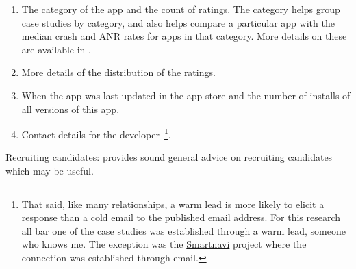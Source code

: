 \begin{enumerate}[label=(\alph*)]
    \itemsep0em
    \item The category of the app and the count of ratings. The category helps group case studies by category, and also helps compare a particular app with the median crash and ANR rates for apps in that category. More details on these are available in .
    \item More details of the distribution of the ratings.
    \item When the app was last updated in the app store and the number of installs of all versions of this app.
    \item Contact details for the developer~\footnote{That said, like many relationships, a warm lead is more likely to elicit a response than a cold email to the published email address. For this research all bar one of the case studies was established through a warm lead, someone who knows me. The exception was the \href{https://github.com/Phantast/smartnavi}{Smartnavi} project where the connection was established through email.}.
\end{enumerate}

Recruiting candidates:  provides sound general advice on recruiting candidates which may be useful.